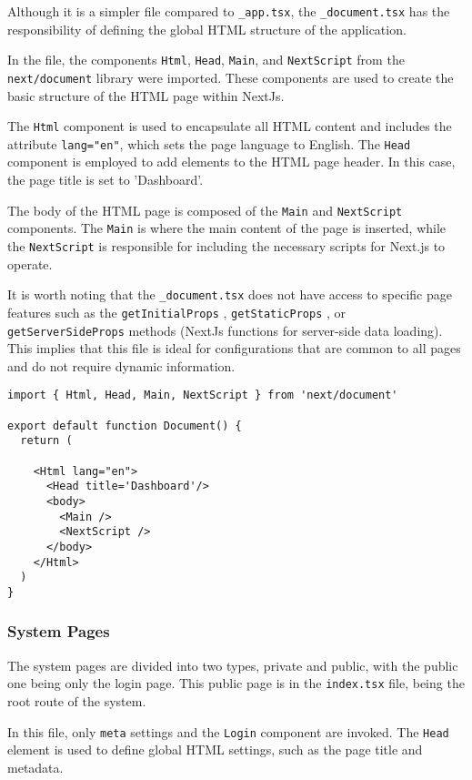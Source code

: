 Although it is a simpler file compared to \texttt{\_app.tsx}, the \texttt{\_document.tsx} has the responsibility of defining the global HTML structure of the application.

In the file, the components \texttt{Html}, \texttt{Head}, \texttt{Main}, and \texttt{NextScript} from the \texttt{next/document} library were imported. These components are used to create the basic structure of the HTML page within NextJs.

The \texttt{Html} component is used to encapsulate all HTML content and includes the attribute \texttt{lang="en"}, which sets the page language to English. The \texttt{Head} component \cite{nextjsHeadComponent} is employed to add elements to the HTML page header. In this case, the page title is set to 'Dashboard'.

The body of the HTML page is composed of the \texttt{Main} and \texttt{NextScript} components. The \texttt{Main} is where the main content of the page is inserted, while the \texttt{NextScript} is responsible for including the necessary scripts for Next.js to operate.

It is worth noting that the \texttt{\_document.tsx} does not have access to specific page features such as the \texttt{getInitialProps} \cite{nextjsInitialProps}, \texttt{getStaticProps} \cite{nextjsGetStaticProps}, or \texttt{getServerSideProps} \cite{nextjsGetServerSideProps} methods (NextJs functions for server-side data loading). This implies that this file is ideal for configurations that are common to all pages and do not require dynamic information.

\begin{verbatim}
import { Html, Head, Main, NextScript } from 'next/document'

export default function Document() {
  return (

    <Html lang="en">
      <Head title='Dashboard'/>
      <body>
        <Main />
        <NextScript />
      </body>
    </Html>
  )
}
\end{verbatim}

\subsubsection{System Pages}\label{subsec:}
The system pages are divided into two types, private and public, with the public one being only the login page. This public page is in the \texttt{index.tsx} file, being the root route of the system.

In this file, only \texttt{meta} settings and the \texttt{Login} component are invoked. The \texttt{Head} element \cite{nextjsHeadComponent} is used to define global HTML settings, such as the page title and metadata.


